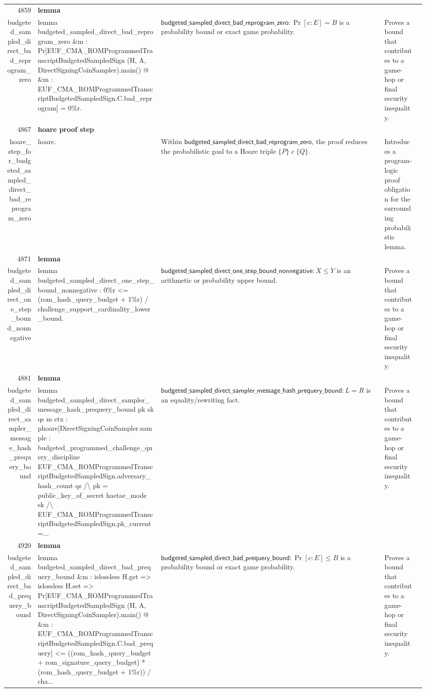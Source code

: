 \documentclass[10pt]{article}
\newcommand{\ec}[1]{\begingroup\ttfamily\scriptsize #1\endgroup}
\begin{document}
\begin{longtable}{r L{0.17\textwidth} L{0.26\textwidth} L{0.27\textwidth} L{0.20\textwidth}}
4859 & \textbf{lemma}\\\ec{budgeted\_sampled\_direct\_bad\_reprogram\_zero} & \ec{lemma budgeted\_sampled\_direct\_bad\_reprogram\_zero \&m : Pr[EUF\_CMA\_ROMProgrammedTranscriptBudgetedSampledSign (H, A, DirectSigningCoinSampler).main() @ \&m : EUF\_CMA\_ROMProgrammedTranscriptBudgetedSampledSign.C.bad\_reprogram] = 0\%r.} & \(\mathsf{budgeted\_sampled\_direct\_bad\_reprogram\_zero} : \Pr[c : E] = B\) is a probability bound or exact game probability. & Proves a bound that contributes to a game-hop or final security inequality. \\
4867 & \textbf{hoare proof step}\\\ec{hoare\_step\_for\_budgeted\_sampled\_direct\_bad\_reprogram\_zero} & \ec{hoare.} & Within \(\mathsf{budgeted\_sampled\_direct\_bad\_reprogram\_zero}\), the proof reduces the probabilistic goal to a Hoare triple \(\{P\}\;c\;\{Q\}\). & Introduces a program-logic proof obligation for the surrounding probabilistic lemma. \\
4871 & \textbf{lemma}\\\ec{budgeted\_sampled\_direct\_one\_step\_bound\_nonnegative} & \ec{lemma budgeted\_sampled\_direct\_one\_step\_bound\_nonnegative : 0\%r <= (rom\_hash\_query\_budget + 1\%r) / challenge\_support\_cardinality\_lower\_bound.} & \(\mathsf{budgeted\_sampled\_direct\_one\_step\_bound\_nonnegative} : X \le Y\) is an arithmetic or probability upper bound. & Proves a bound that contributes to a game-hop or final security inequality. \\
4881 & \textbf{lemma}\\\ec{budgeted\_sampled\_direct\_sampler\_message\_hash\_prequery\_bound} & \ec{lemma budgeted\_sampled\_direct\_sampler\_message\_hash\_prequery\_bound pk sk qs m ctx : phoare[DirectSigningCoinSampler.sample : budgeted\_programmed\_challenge\_query\_discipline EUF\_CMA\_ROMProgrammedTranscriptBudgetedSampledSign.adversary\_hash\_count qs /\textbackslash{} pk = public\_key\_of\_secret haetae\_mode sk /\textbackslash{} EUF\_CMA\_ROMProgrammedTranscriptBudgetedSampledSign.pk\_current =...} & \(\mathsf{budgeted\_sampled\_direct\_sampler\_message\_hash\_prequery\_bound} : L = R\) is an equality/rewriting fact. & Proves a bound that contributes to a game-hop or final security inequality. \\
4920 & \textbf{lemma}\\\ec{budgeted\_sampled\_direct\_bad\_prequery\_bound} & \ec{lemma budgeted\_sampled\_direct\_bad\_prequery\_bound \&m : islossless H.get => islossless H.set => Pr[EUF\_CMA\_ROMProgrammedTranscriptBudgetedSampledSign (H, A, DirectSigningCoinSampler).main() @ \&m : EUF\_CMA\_ROMProgrammedTranscriptBudgetedSampledSign.C.bad\_prequery] <= ((rom\_hash\_query\_budget + rom\_signature\_query\_budget) * (rom\_hash\_query\_budget + 1\%r)) / cha...} & \(\mathsf{budgeted\_sampled\_direct\_bad\_prequery\_bound} : \Pr[c : E] \le B\) is a probability bound or exact game probability. & Proves a bound that contributes to a game-hop or final security inequality. \\

\end{longtable}
\end{document}
